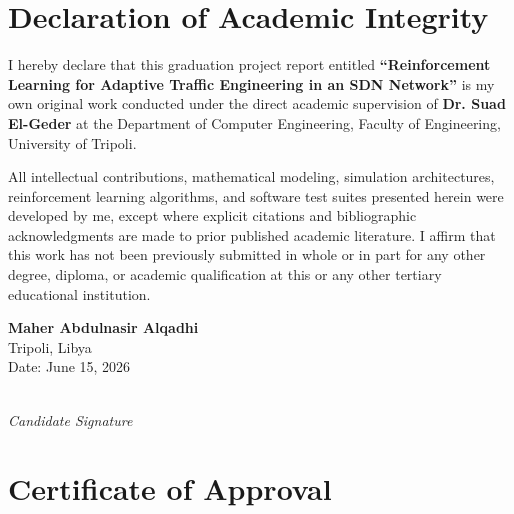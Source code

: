 \documentclass[12pt,a4paper,oneside]{report}
\begin{document}
\setcounter{page}{1}

\chapter*{Declaration of Academic Integrity}

I hereby declare that this graduation project report entitled \textbf{``Reinforcement Learning for Adaptive Traffic Engineering in an SDN Network''} is my own original work conducted under the direct academic supervision of \textbf{Dr. Suad El-Geder} at the Department of Computer Engineering, Faculty of Engineering, University of Tripoli. 

All intellectual contributions, mathematical modeling, simulation architectures, reinforcement learning algorithms, and software test suites presented herein were developed by me, except where explicit citations and bibliographic acknowledgments are made to prior published academic literature. I affirm that this work has not been previously submitted in whole or in part for any other degree, diploma, or academic qualification at this or any other tertiary educational institution.

\vspace{2.0cm}

\noindent
\begin{minipage}{0.5\textwidth}
    \begin{flushleft}
        \textbf{Maher Abdulnasir Alqadhi}\\
        Tripoli, Libya\\
        Date: June 15, 2026
    \end{flushleft}
\end{minipage}
\hfill
\begin{minipage}{0.4\textwidth}
    \begin{flushright}
        \dotfill\\
        \emph{Candidate Signature}
    \end{flushright}
\end{minipage}

\newpage

\chapter*{Certificate of Approval}
\end{document}
